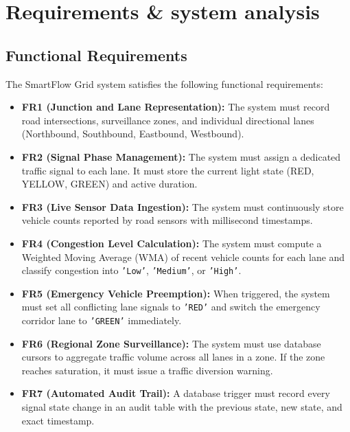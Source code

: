 \documentclass[11pt,a4paper]{article}
\begin{document}
\section{Requirements \& system analysis}

\subsection{Functional Requirements}
The SmartFlow Grid system satisfies the following functional requirements:
\begin{itemize}
    \item \textbf{FR1 (Junction and Lane Representation):} The system must record road intersections, surveillance zones, and individual directional lanes (Northbound, Southbound, Eastbound, Westbound).
    \item \textbf{FR2 (Signal Phase Management):} The system must assign a dedicated traffic signal to each lane. It must store the current light state (RED, YELLOW, GREEN) and active duration.
    \item \textbf{FR3 (Live Sensor Data Ingestion):} The system must continuously store vehicle counts reported by road sensors with millisecond timestamps.
    \item \textbf{FR4 (Congestion Level Calculation):} The system must compute a Weighted Moving Average (WMA) of recent vehicle counts for each lane and classify congestion into \texttt{'Low'}, \texttt{'Medium'}, or \texttt{'High'}.
    \item \textbf{FR5 (Emergency Vehicle Preemption):} When triggered, the system must set all conflicting lane signals to \texttt{'RED'} and switch the emergency corridor lane to \texttt{'GREEN'} immediately.
    \item \textbf{FR6 (Regional Zone Surveillance):} The system must use database cursors to aggregate traffic volume across all lanes in a zone. If the zone reaches saturation, it must issue a traffic diversion warning.
    \item \textbf{FR7 (Automated Audit Trail):} A database trigger must record every signal state change in an audit table with the previous state, new state, and exact timestamp.
\end{itemize}
\end{document}
